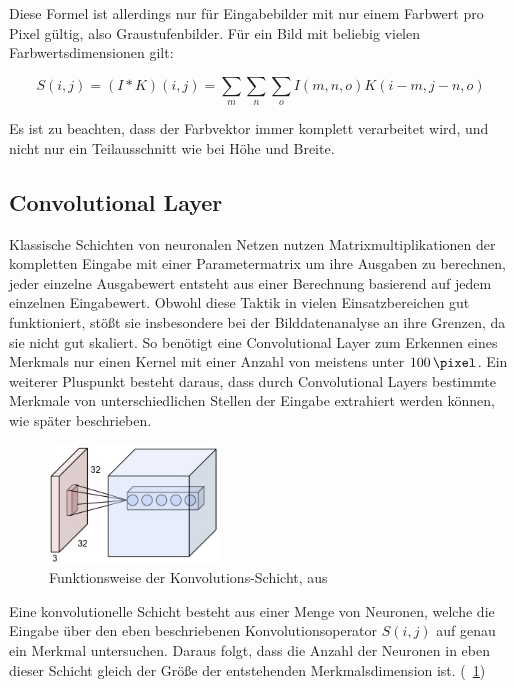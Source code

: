 Diese Formel ist allerdings nur für Eingabebilder mit nur einem Farbwert pro Pixel gültig, also Graustufenbilder. Für ein Bild mit beliebig vielen Farbwertsdimensionen gilt:

\begin{equation}
S(i,j) = (I*K)(i,j) = \sum_{m}\sum_{n}\sum_{o}I(m,n,o)K(i-m,j-n,o)
\end{equation}

Es ist zu beachten, dass der Farbvektor immer komplett verarbeitet wird, und nicht nur ein Teilausschnitt wie bei Höhe und Breite.

\subsection{Convolutional Layer}
\label{ssec:convlayer}

Klassische Schichten von neuronalen Netzen nutzen Matrixmultiplikationen der kompletten Eingabe mit einer Parametermatrix um ihre Ausgaben zu berechnen, \dahe jeder einzelne Ausgabewert entsteht aus einer Berechnung basierend auf jedem einzelnen Eingabewert. Obwohl diese Taktik in vielen Einsatzbereichen gut funktioniert, stößt sie insbesondere bei der Bilddatenanalyse an ihre Grenzen, da sie nicht gut skaliert. \cite{cs231n} So benötigt eine Convolutional Layer zum Erkennen eines Merkmals nur einen Kernel mit einer Anzahl von meistens unter $\SI{100}{\pixel}$. \cite{deeplearning_16} Ein weiterer Pluspunkt besteht daraus, dass durch Convolutional Layers bestimmte Merkmale von unterschiedlichen Stellen der Eingabe extrahiert werden können, wie später beschrieben.

\begin{figure}[H]
	\centering
	\includegraphics[width=0.4\textwidth,keepaspectratio]{images/cs231n/convolutional.jpg}
	\caption{Funktionsweise der Konvolutions-Schicht, aus \cite{cs231n}}
	\label{fig:convolutional}
\end{figure}

Eine konvolutionelle Schicht besteht aus einer Menge von Neuronen, welche die Eingabe über den eben beschriebenen Konvolutionsoperator $S(i,j)$ auf genau ein Merkmal untersuchen. Daraus folgt, dass die Anzahl der Neuronen in eben dieser Schicht gleich der Größe der entstehenden Merkmalsdimension ist. (\vgl \figurename~\ref{fig:convolutional})

